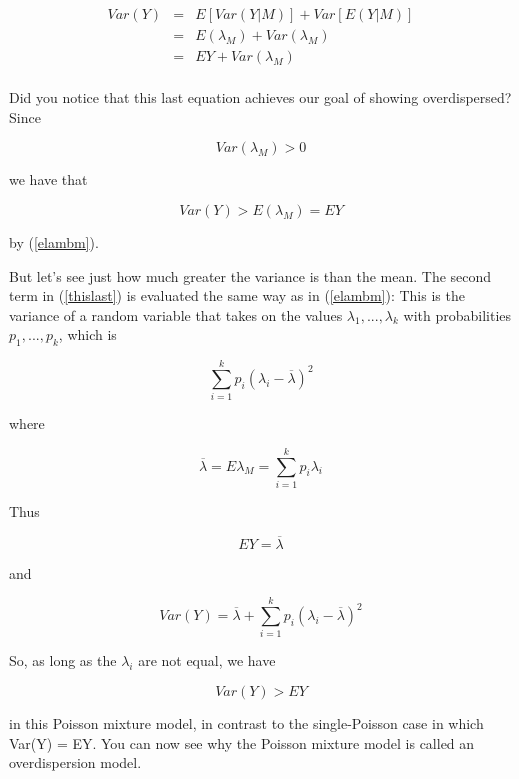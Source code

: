 \documentclass[11pt]{article}
\begin{document}
\begin{eqnarray}
Var(Y) &=& E[Var(Y|M)] + Var[E(Y|M)] \\ 
&=& E(\lambda_M) + Var(\lambda_M) \label{thislast} \\
&=& EY + Var(\lambda_M) \label{thislast} \\
\end{eqnarray}

Did you notice that this last equation achieves our goal of showing
overdispersed?  Since

\begin{equation}
Var(\lambda_M) > 0
\end{equation}

we have that

\begin{equation}
Var(Y) > E(\lambda_M) = EY
\end{equation}

by (\ref{elambm}).

But let's see just how much greater the variance is than the mean.  The
second term in (\ref{thislast}) is evaluated the same way as in
(\ref{elambm}):  This is the variance of a random variable that takes on
the values $\lambda_1,...,\lambda_k$ with probabilities $p_1,...,p_k$,
which is

\begin{equation}
\sum_{i=1}^k p_i (\lambda_i - \overline{\lambda})^2
\end{equation}

where 

\begin{equation}
\overline{\lambda} =  E\lambda_M = \sum_{i=1}^k p_i \lambda_i
\end{equation}

Thus

\begin{equation}
EY = \overline{\lambda}
\end{equation}

and

\begin{equation}
Var(Y) = \overline{\lambda} + 
\sum_{i=1}^k p_i (\lambda_i - \overline{\lambda})^2
\end{equation}

So, as long as the $\lambda_i$ are not equal, we have

\begin{equation}
Var(Y) > EY
\end{equation}

in this Poisson mixture model, in contrast to the single-Poisson case
in which Var(Y) = EY.  You can now see why the Poisson mixture model is
called an overdispersion model.
\end{document}
